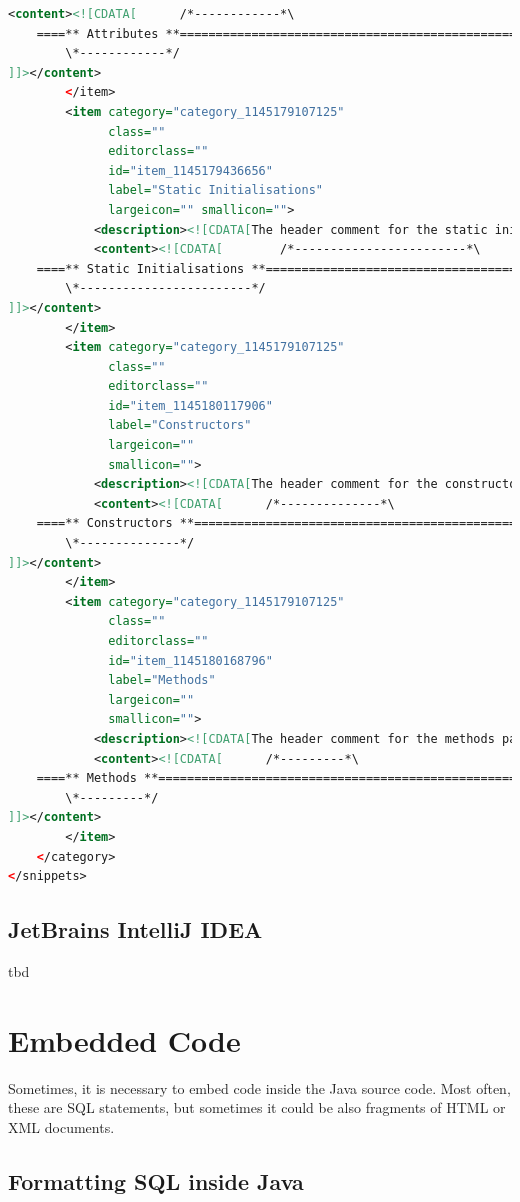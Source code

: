 \documentclass[11pt,a4paper, titlepage, parskip=half, headsepline, footsepline, cleardoublepage=current, headheight=1cm]{scrbook}
\begin{document}
\begin{lstlisting}[language=XML,basicstyle=\ttfamily\footnotesize]
            <content><![CDATA[      /*------------*\
    ====** Attributes **=======================================================
        \*------------*/
]]></content>
        </item>
        <item category="category_1145179107125"
              class=""
              editorclass=""
              id="item_1145179436656"
              label="Static Initialisations"
              largeicon="" smallicon="">
            <description><![CDATA[The header comment for the static initialisations part]]></description>
            <content><![CDATA[        /*------------------------*\
    ====** Static Initialisations **===========================================
        \*------------------------*/
]]></content>
        </item>
        <item category="category_1145179107125"
              class=""
              editorclass=""
              id="item_1145180117906"
              label="Constructors"
              largeicon=""
              smallicon="">
            <description><![CDATA[The header comment for the constructors part]]></description>
            <content><![CDATA[    	/*--------------*\
    ====** Constructors **=====================================================
        \*--------------*/
]]></content>
        </item>
        <item category="category_1145179107125"
              class=""
              editorclass=""
              id="item_1145180168796"
              label="Methods"
              largeicon=""
              smallicon="">
            <description><![CDATA[The header comment for the methods part]]></description>
            <content><![CDATA[    	/*---------*\
    ====** Methods **==========================================================
        \*---------*/
]]></content>
        </item>
    </category>
</snippets>
\end{lstlisting}

\subsection{JetBrains IntelliJ IDEA}\label{sec:IntelliJConfiguration}
tbd

\section{Embedded Code}
Sometimes, it is necessary to embed code inside the Java source code. Most often, these are SQL statements, but sometimes it could be also fragments of HTML or XML documents.

\subsection{Formatting SQL inside Java}\label{sec:FormattingSQLInsideJava}
\end{document}
